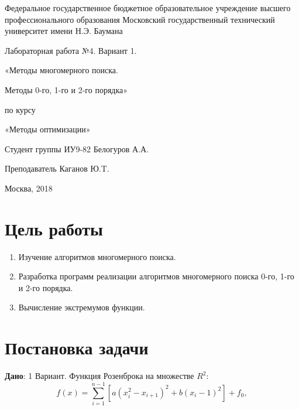 \documentclass[a4paper, 12pt]{article}   	%
\begin{document}
\begin{titlepage}

\thispagestyle{empty}

\begin{center}
Федеральное государственное бюджетное образовательное учреждение высшего профессионального образования Московский государственный технический университет имени Н.Э. Баумана
\end{center}


\vfill

\centerline{\large{Лабораторная работа №4. Вариант 1.}}

\centerline{\large{«Методы многомерного поиска.}} 
\centerline{\large{Методы 0-го, 1-го и 2-го порядка»}}

\centerline{\large{по курсу}}
\centerline{\large{«Методы оптимизации»}}


\vfill

Студент группы ИУ9-82 \hfill Белогуров А.А.

Преподаватель \hfill Каганов Ю.T. 
\vfill

\centerline{Москва, 2018}
\clearpage
\end{titlepage}

\newpage
\setcounter{page}{2}

\tableofcontents

\newpage

\section{Цель работы}

\begin{enumerate}
    \item Изучение алгоритмов многомерного поиска.
    \item Разработка программ реализации алгоритмов многомерного поиска 0-го, 1-го  и 2-го порядка.
    \item Вычисление экстремумов функции. 
\end{enumerate}

\newpage

\section{Постановка задачи}
    \textbf {Дано}: 1 Вариант. Функция Розенброка на множестве $R^2$:
    \begin{equation}
        f(x) = \sum^{n-1}_{i=1}{[a(x_i^2 - x_{i+1})^2 + b(x_i - 1)^2] + f_0},
    \end{equation}
    
\end{document}
